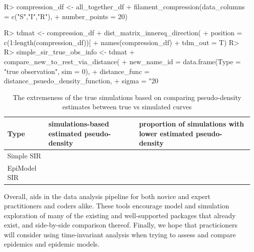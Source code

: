 \documentclass[
  shortnames]{jss}
\begin{document}
\begin{CodeChunk}
\begin{CodeInput}
R> compression_df <- all_together_df %
+   filament_compression(data_columns = c("S","I","R"), 
+                        number_points = 20)
\end{CodeInput}
\end{CodeChunk}

\begin{CodeChunk}
\begin{CodeInput}
R> tdmat <- compression_df %
+   dist_matrix_innersq_direction(
+     position = c(1:length(compression_df))[
+       names(compression_df) %
+     tdm_out = T)
R> 
R> simple_sir_true_obs_info <- tdmat %
+   compare_new_to_rest_via_distance(
+     new_name_id = data.frame(Type = "true observation", sim = 0),
+     distance_func = distance_psuedo_density_function, 
+     sigma = "20%
\end{CodeInput}
\end{CodeChunk}

\begin{CodeChunk}
\begin{table}[!h]

\caption{\label{tab:hags-extreme}The extremeness of the true simulations based on comparing pseudo-density estimates between true vs simulated curves}
\centering
\begin{tabular}[t]{l>{\raggedleft\arraybackslash}p{6cm}>{\raggedleft\arraybackslash}p{6cm}}
\toprule
Type & simulations-based estimated pseudo-density & proportion of simulations with lower estimated pseudo-density\\
\midrule
Simple SIR & 0.0036733 & 0\\
EpiModel SIR & 0.0028813 & 0\\
\bottomrule
\end{tabular}
\end{table}

\end{CodeChunk}

Overall,  aids in the data analysis pipeline for both
novice and expert practitioners and coders alike. These tools encourage
model and simulation exploration of many of the existing and
well-supported packages that already exist, and side-by-side comparison
thereof. Finally, we hope that practicioners will consider using
time-invariant analysis when trying to assess and compare epidemics and
epidemic models.
\end{document}
